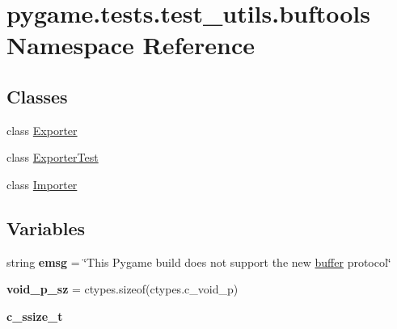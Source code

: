 \hypertarget{namespacepygame_1_1tests_1_1test__utils_1_1buftools}{}\section{pygame.\+tests.\+test\+\_\+utils.\+buftools Namespace Reference}
\label{namespacepygame_1_1tests_1_1test__utils_1_1buftools}
\subsection*{Classes}
\begin{DoxyCompactItemize}
\item 
class \hyperlink{classpygame_1_1tests_1_1test__utils_1_1buftools_1_1_exporter}{Exporter}
\item 
class \hyperlink{classpygame_1_1tests_1_1test__utils_1_1buftools_1_1_exporter_test}{Exporter\+Test}
\item 
class \hyperlink{classpygame_1_1tests_1_1test__utils_1_1buftools_1_1_importer}{Importer}
\end{DoxyCompactItemize}
\subsection*{Variables}
\begin{DoxyCompactItemize}
\item 
\mbox{\label{namespacepygame_1_1tests_1_1test__utils_1_1buftools_a0bc2b96247e46a6ffdb829c714e19f24}} 
string {\bfseries emsg} = \char`\"{}This Pygame build does not support the new \hyperlink{structbuffer}{buffer} protocol\char`\"{}
\item 
\mbox{\label{namespacepygame_1_1tests_1_1test__utils_1_1buftools_a8885d176250ae6dac1b88462186c4dd3}} 
{\bfseries void\+\_\+p\+\_\+sz} = ctypes.\+sizeof(ctypes.\+c\+\_\+void\+\_\+p)
\item 
\mbox{\label{namespacepygame_1_1tests_1_1test__utils_1_1buftools_aca7d8c65900927f13682c80b7c6b3ef5}} 
{\bfseries c\+\_\+ssize\+\_\+t}
\end{DoxyCompactItemize}


